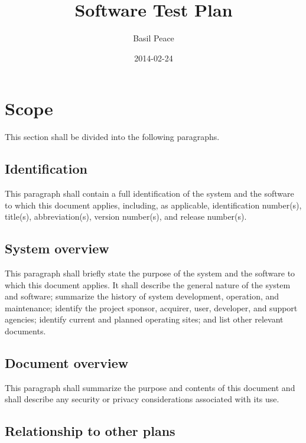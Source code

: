 \documentclass{fidata-report-template}
\begin{document}
\frontmatter

\title{Software Test Plan}

\date{2014-02-24}

\author{Basil Peace}

\maketitle
\tableofcontents

\section{Scope}

This section shall be divided into the following paragraphs.

\subsection{Identification}

This paragraph shall contain a full identification of the system and the
software to which this document applies, including, as applicable,
identification number(s), title(s), abbreviation(s), version number(s),
and release number(s).

\subsection{System overview}

This paragraph shall briefly state the purpose of the system and the
software to which this document applies. It shall describe the general
nature of the system and software; summarize the history of system
development, operation, and maintenance; identify the project sponsor,
acquirer, user, developer, and support agencies; identify current and
planned operating sites; and list other relevant documents.

\subsection{Document overview}

This paragraph shall summarize the purpose and contents of this document
and shall describe any security or privacy considerations associated
with its use.

\subsection{Relationship to other plans}
\end{document}
